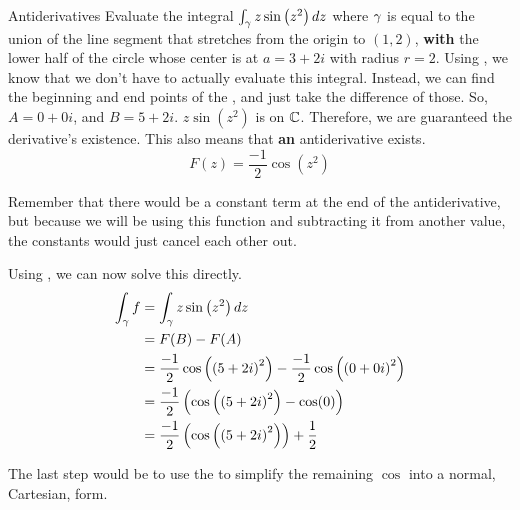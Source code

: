 \begin{example}[Lecture 7]{Antiderivatives}
  Evaluate the integral $\int_{\gamma} z \sin \left( z^{2} \right) dz$ where $\gamma$ is equal to the union of the line segment that stretches from the origin to $(1, 2)$, \textbf{with} the lower half of the circle whose center is at $a = 3+2i$ with radius $r = 2$.
  \tcblower{}
  Using , we know that we don't have to actually evaluate this integral.
  Instead, we can find the beginning and end points of the , and just take the difference of those.
  So, $A = 0+0i$, and $B = 5+2i$.
  $z \sin \left( z^{2} \right)$ is  on $\operatorname{\mathbb{C}}$.
  Therefore, we are guaranteed the derivative's existence.
  This also means that \textbf{an} antiderivative exists.
  \begin{equation*}
    F(z) = \frac{-1}{2} \cos \left( z^{2} \right)
  \end{equation*}

  Remember that there would be a constant term at the end of the antiderivative, but because we will be using this function and subtracting it from another value, the constants would just cancel each other out.

  Using , we can now solve this directly.
  \begin{align*}
    \int_{\gamma} f &= \int_{\gamma} z \sin \left( z^{2} \right) dz \\
                   &= F(B) - F(A) \\
                   &= \frac{-1}{2} \cos \left( {(5+2i)}^{2} \right) - \frac{-1}{2} \cos \left( {(0+0i)}^{2} \right) \\
                   &= \frac{-1}{2} \left( \cos \left( {(5+2i)}^{2} \right) - \cos(0) \right) \\
                   &= \frac{-1}{2} \left( \cos \left( {(5+2i)}^{2} \right) \right) + \frac{1}{2} \\
  \end{align*}

  The last step would be to use the  to simplify the remaining $\cos$ into a normal, Cartesian, form.
\end{example}

